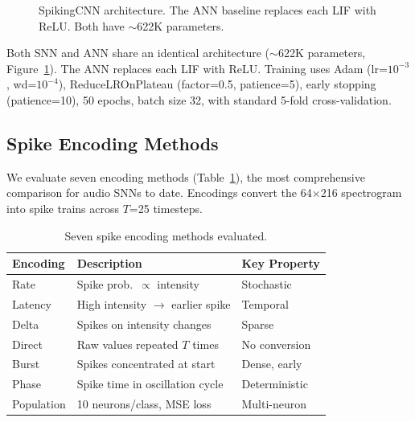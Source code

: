 \documentclass[sigconf,nonacm=false]{acmart}
\begin{document}
\begin{figure}[t]
\centering
{}
\caption{SpikingCNN architecture. The ANN baseline replaces each LIF with ReLU. Both have $\sim$622K parameters.}
\label{fig:architecture}
\end{figure}

Both SNN and ANN share an identical architecture ($\sim$622K parameters, Figure~\ref{fig:architecture}). The ANN replaces each LIF with ReLU. Training uses Adam (lr=$10^{-3}$, wd=$10^{-4}$), ReduceLROnPlateau (factor=0.5, patience=5), early stopping (patience=10), 50 epochs, batch size 32, with standard 5-fold cross-validation.

\subsection{Spike Encoding Methods}

We evaluate seven encoding methods (Table~\ref{tab:encodings}), the most comprehensive comparison for audio SNNs to date. Encodings convert the 64$\times$216 spectrogram into spike trains across $T$=25 timesteps.

\begin{table}[t]
\caption{Seven spike encoding methods evaluated.}
\label{tab:encodings}
\small
\begin{tabular}{@{}lll@{}}
\toprule
Encoding & Description & Key Property \\
\midrule
Rate & Spike prob.\ $\propto$ intensity & Stochastic \\
Latency & High intensity $\to$ earlier spike & Temporal \\
Delta & Spikes on intensity changes & Sparse \\
Direct & Raw values repeated $T$ times & No conversion \\
Burst & Spikes concentrated at start & Dense, early \\
Phase & Spike time in oscillation cycle & Deterministic \\
Population & 10 neurons/class, MSE loss & Multi-neuron \\
\bottomrule
\end{tabular}
\end{table}
\end{document}
